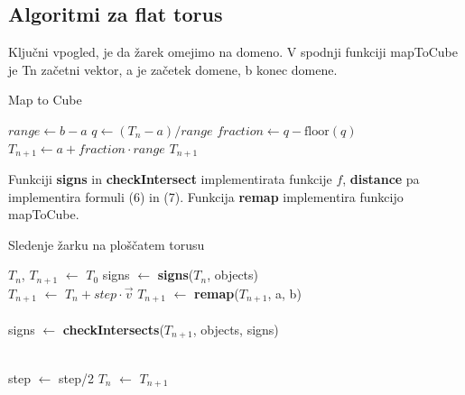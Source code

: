 \documentclass[titlepage]{article}
\begin{document}
\subsection{Algoritmi za flat torus}
Ključni vpogled, je da žarek omejimo na domeno. V spodnji funkciji mapToCube je Tn začetni vektor, a je začetek domene, b konec domene.
\begin{algorithm}[H]
\caption{Map to Cube}\label{alg:mapToCube}
\begin{algorithmic}[1]
    \State $range \gets b - a$
    \State $q \gets (T_{n} - a) / range$
    \State $fraction \gets q - \text{floor}(q)$
    \State $T_{n+1} \gets a + fraction \cdot range$
    \State \Return $T_{n+1}$
\EndFunction
\end{algorithmic}
\end{algorithm}

Funkciji \textbf{signs} in \textbf{checkIntersect} implementirata funkcije \( f \), \textbf{distance} pa implementira formuli (6) in 
(7). Funkcija \textbf{remap} implementira funkcijo mapToCube.
\begin{algorithm}[H]
    \caption{Sledenje žarku na ploščatem torusu}
\begin{algorithmic}

    \State $T_{n}$, $T_{n+1}$ $\gets$ $T_{0}$
    \State signs $\gets$ \textbf{signs}($T_{n}$, objects)
    \\
      \State {}
      \State {}
    \EndIf
    \State $T_{n+1}$ $\gets$ $T_{n}+step \cdot \vec{v}$
    \State $T_{n+1}$ $\gets$ \textbf{remap}($T_{n+1}$, a, b)
    \\
    \\
    \State signs $\gets$ \textbf{checkIntersects}($T_{n+1}$, objects, signs)
    \\
    \\

        \State step $\gets$ step/2
    \Else
      \State $T_{n}$ $\gets$ $T_{n+1}$
    \EndIf
  \EndWhile
\EndFunction
\end{algorithmic}
\end{algorithm}
\end{document}
